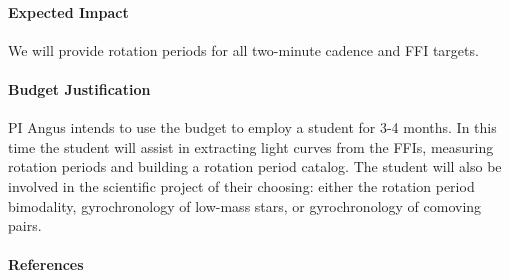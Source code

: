 \documentclass[letterpaper,12pt,preprint]{hack_aastex}
\begin{document}

\paragraph{Expected Impact}
We will provide rotation periods for all two-minute cadence and FFI targets.

\paragraph{Budget Justification}
PI Angus intends to use the budget to employ a student for 3-4 months.
In this time the student will assist in extracting light curves from the FFIs,
measuring rotation periods and building a rotation period catalog.
The student will also be involved in the scientific project of their choosing:
either the rotation period bimodality, gyrochronology of low-mass stars, or
gyrochronology of comoving pairs.

\paragraph{References}

{\footnotesize

}
\end{document}
